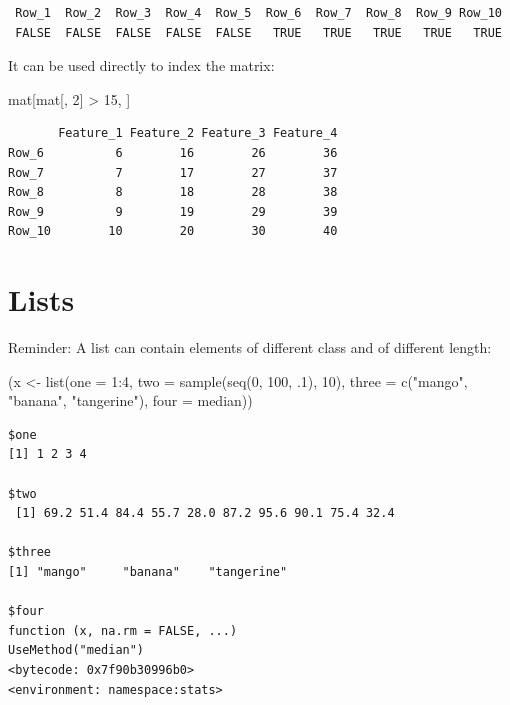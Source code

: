 \documentclass[
]{book}
\newenvironment{Shaded}{\begin{snugshade}}{\end{snugshade}}
\newcommand{\AttributeTok}[1]{\textcolor[rgb]{0.77,0.63,0.00}{#1}}
\newcommand{\DecValTok}[1]{\textcolor[rgb]{0.00,0.00,0.81}{#1}}
\newcommand{\FunctionTok}[1]{\textcolor[rgb]{0.00,0.00,0.00}{#1}}
\newcommand{\NormalTok}[1]{#1}
\newcommand{\OtherTok}[1]{\textcolor[rgb]{0.56,0.35,0.01}{#1}}
\newcommand{\SpecialCharTok}[1]{\textcolor[rgb]{0.00,0.00,0.00}{#1}}
\newcommand{\StringTok}[1]{\textcolor[rgb]{0.31,0.60,0.02}{#1}}
\begin{document}
\begin{verbatim}
 Row_1  Row_2  Row_3  Row_4  Row_5  Row_6  Row_7  Row_8  Row_9 Row_10 
 FALSE  FALSE  FALSE  FALSE  FALSE   TRUE   TRUE   TRUE   TRUE   TRUE 
\end{verbatim}

It can be used directly to index the matrix:

\begin{Shaded}
\begin{Highlighting}[]
\NormalTok{mat[mat[, }\DecValTok{2}\NormalTok{] }\SpecialCharTok{\textgreater{}} \DecValTok{15}\NormalTok{, ]}
\end{Highlighting}
\end{Shaded}

\begin{verbatim}
       Feature_1 Feature_2 Feature_3 Feature_4
Row_6          6        16        26        36
Row_7          7        17        27        37
Row_8          8        18        28        38
Row_9          9        19        29        39
Row_10        10        20        30        40
\end{verbatim}

\hypertarget{indexlists}{%
\section{Lists}\label{indexlists}}

Reminder: A list can contain elements of different class and of different length:

\begin{Shaded}
\begin{Highlighting}[]
\NormalTok{(x }\OtherTok{\textless{}{-}} \FunctionTok{list}\NormalTok{(}\AttributeTok{one =} \DecValTok{1}\SpecialCharTok{:}\DecValTok{4}\NormalTok{,}
           \AttributeTok{two =} \FunctionTok{sample}\NormalTok{(}\FunctionTok{seq}\NormalTok{(}\DecValTok{0}\NormalTok{, }\DecValTok{100}\NormalTok{, .}\DecValTok{1}\NormalTok{), }\DecValTok{10}\NormalTok{),}
           \AttributeTok{three =} \FunctionTok{c}\NormalTok{(}\StringTok{"mango"}\NormalTok{, }\StringTok{"banana"}\NormalTok{, }\StringTok{"tangerine"}\NormalTok{),}
           \AttributeTok{four =}\NormalTok{ median))}
\end{Highlighting}
\end{Shaded}

\begin{verbatim}
$one
[1] 1 2 3 4

$two
 [1] 69.2 51.4 84.4 55.7 28.0 87.2 95.6 90.1 75.4 32.4

$three
[1] "mango"     "banana"    "tangerine"

$four
function (x, na.rm = FALSE, ...) 
UseMethod("median")
<bytecode: 0x7f90b30996b0>
<environment: namespace:stats>
\end{verbatim}
\end{document}
